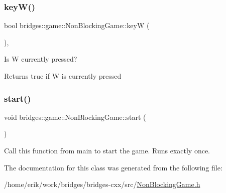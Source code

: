 \subsubsection{\texorpdfstring{key\+W()}{keyW()}}
{\footnotesize\ttfamily bool bridges\+::game\+::\+Non\+Blocking\+Game\+::keyW (\begin{DoxyParamCaption}{ }\end{DoxyParamCaption})\hspace{0.3cm}{\ttfamily [inline]}, {\ttfamily [protected]}}



Is W currently pressed? 

\begin{DoxyReturn}{Returns}
true if W is currently pressed 
\end{DoxyReturn}
\mbox{\label{classbridges_1_1game_1_1_non_blocking_game_ab48a0d690368bb8ff7b02aad0b6f336e}} 
\subsubsection{\texorpdfstring{start()}{start()}}
{\footnotesize\ttfamily void bridges\+::game\+::\+Non\+Blocking\+Game\+::start (\begin{DoxyParamCaption}{ }\end{DoxyParamCaption})\hspace{0.3cm}{\ttfamily [inline]}}



Call this function from main to start the game. Runs exactly once. 



The documentation for this class was generated from the following file\+:\begin{DoxyCompactItemize}
\item 
/home/erik/work/bridges/bridges-\/cxx/src/\hyperlink{_non_blocking_game_8h}{Non\+Blocking\+Game.\+h}\end{DoxyCompactItemize}
